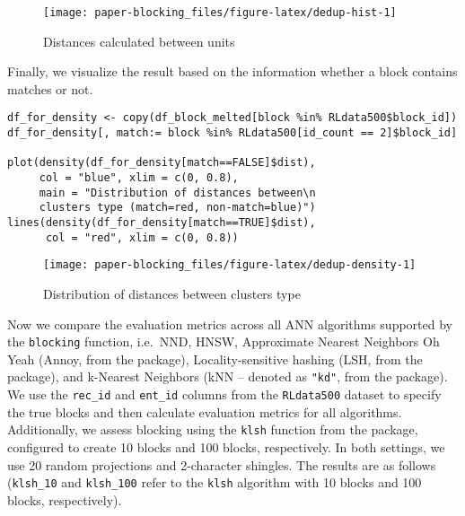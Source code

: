 \begin{figure}[H]

{\centering \texttt{[image: paper-blocking\_files/figure-latex/dedup-hist-1]} 

}

\caption{Distances calculated between units}\label{fig:dedup-hist}
\end{figure}

Finally, we visualize the result based on the information whether a
block contains matches or not.

\begin{verbatim}
df_for_density <- copy(df_block_melted[block %in% RLdata500$block_id])
df_for_density[, match:= block %in% RLdata500[id_count == 2]$block_id]

plot(density(df_for_density[match==FALSE]$dist),
     col = "blue", xlim = c(0, 0.8), 
     main = "Distribution of distances between\n
     clusters type (match=red, non-match=blue)")
lines(density(df_for_density[match==TRUE]$dist),
      col = "red", xlim = c(0, 0.8))
\end{verbatim}

\begin{figure}[H]

{\centering \texttt{[image: paper-blocking\_files/figure-latex/dedup-density-1]} 

}

\caption{Distribution of distances between clusters type}\label{fig:dedup-density}
\end{figure}

Now we compare the evaluation metrics across all ANN algorithms
supported by the \texttt{blocking} function, i.e.~NND, HNSW, Approximate
Nearest Neighbors Oh Yeah (Annoy, from the  package),
Locality-sensitive hashing (LSH, from the  package), and
k-Nearest Neighbors (kNN -- denoted as \texttt{"kd"}, from the 
package). We use the \texttt{rec\_id} and \texttt{ent\_id} columns from the \texttt{RLdata500}
dataset to specify the true blocks and then calculate evaluation metrics
for all algorithms. Additionally, we assess blocking using the \texttt{klsh}
function from the  package, configured to create 10 blocks
and 100 blocks, respectively. In both settings, we use 20 random
projections and 2-character shingles. The results are as follows
(\texttt{klsh\_10} and \texttt{klsh\_100} refer to the \texttt{klsh} algorithm with 10 blocks
and 100 blocks, respectively).


